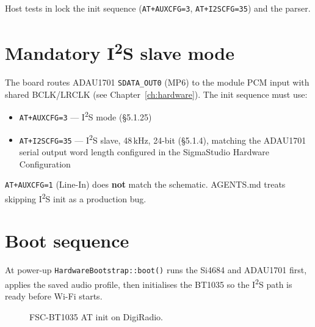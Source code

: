Host tests in  lock the
init sequence (\texttt{AT+AUXCFG=3}, \texttt{AT+I2SCFG=35}) and the parser.

\section{Mandatory I\textsuperscript{2}S slave mode}
\label{sec:bt1035-i2s}

\begin{drcaution}
The board routes ADAU1701 \texttt{SDATA\_OUT0} (MP6) to the module PCM input
with shared BCLK/LRCLK (see Chapter~\ref{ch:hardware}). The init sequence
must use:
\begin{itemize}
  \item \texttt{AT+AUXCFG=3} --- I\textsuperscript{2}S mode (§5.1.25)
  \item \texttt{AT+I2SCFG=35} --- I\textsuperscript{2}S slave, 48\,kHz, 24-bit (§5.1.4),
    matching the ADAU1701 serial output word length configured in the
    SigmaStudio Hardware Configuration
\end{itemize}
\texttt{AT+AUXCFG=1} (Line-In) does \textbf{not} match the schematic.
AGENTS.md treats skipping I\textsuperscript{2}S init as a production bug.
\end{drcaution}

\section{Boot sequence}
\label{sec:bt1035-boot}

At power-up \texttt{HardwareBootstrap::boot()} runs the Si4684 and ADAU1701
first, applies the saved audio profile, then initialises the BT1035 so the
I\textsuperscript{2}S path is ready before Wi-Fi starts.

\begin{figure}[htbp]
  \centering
  \caption{FSC-BT1035 AT init on DigiRadio.}
  \label{fig:bt1035-boot}
\end{figure}

